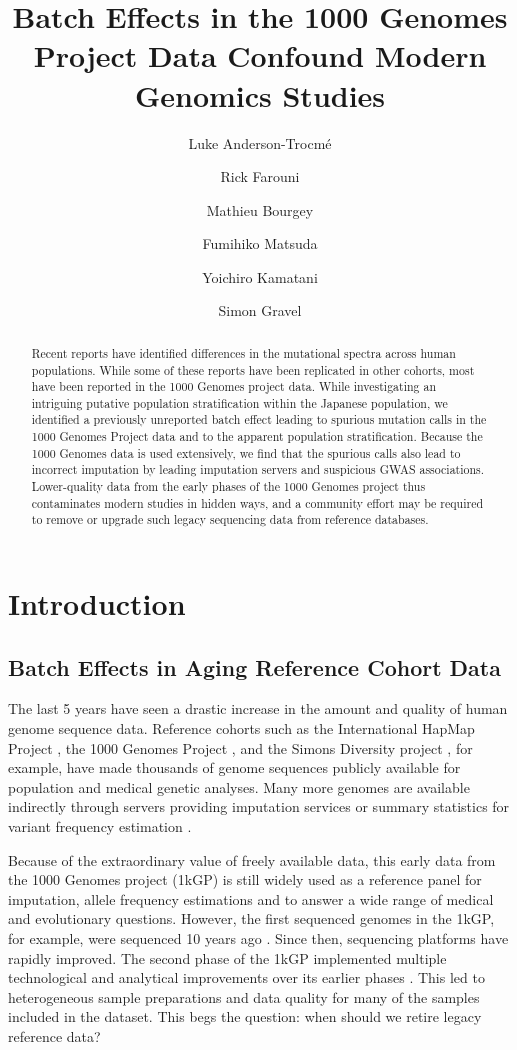 \documentclass[9pt,lineno]{elife}
\title{Batch Effects in the 1000 Genomes Project Data Confound Modern Genomics Studies}
\author[1,2]{Luke Anderson-Trocm\'e}
\author[1,2]{Rick Farouni}
\author[1,2]{Mathieu Bourgey}
\author[3]{Fumihiko Matsuda}
\author[3]{Yoichiro Kamatani}
\author[1,2]{Simon Gravel}
\affil[1]{Department of Human Genetics, McGill University, Montreal, QC H3A 0G1, Canada}
\affil[2]{McGill University and Genome Quebec Innovation Centre, Montreal, QC H3A 0G1, Canada}
\affil[3]{Center for Genomic Medicine, Graduate School of Medicine, Kyoto University, Kyoto 606-8501, Japan}
\begin{document}
\maketitle
\begin{abstract}
Recent reports have identified differences in the mutational spectra across human populations. While some of these reports have been replicated in other cohorts, most have been reported in the 1000 Genomes project data. While investigating an intriguing putative population stratification within the Japanese population, we identified a previously unreported batch effect leading to spurious mutation calls in the 1000 Genomes Project data and to the apparent population stratification. Because the 1000 Genomes data is used extensively, we find that the spurious calls also lead to incorrect imputation by leading imputation servers and suspicious GWAS associations. Lower-quality data from the early phases of the 1000 Genomes project thus contaminates modern studies in hidden ways, and a community effort may be required to remove or upgrade such legacy sequencing data from reference databases. 
\end{abstract}

\section{Introduction}
		
\subsection{Batch Effects in Aging Reference Cohort Data}			

The last 5 years have seen a drastic increase in the amount and quality of human genome sequence data. 
Reference cohorts such as the International HapMap Project \citep{HapMap2005}, the 1000 Genomes Project \citep{1000GenomesProjectConsortium2010,The1000GenomesProjectConsortium2012}, and the Simons Diversity project \citep{Mallick2016}, for example, have made thousands of genome sequences publicly available for population and medical genetic analyses. 
Many more genomes are available indirectly through servers providing imputation services \citep{HapMap2005} or summary statistics for variant frequency estimation \citep{Lek2016}.

Because of the extraordinary value of freely available data, this early data from the 1000 Genomes project (1kGP) is still widely used as a reference panel for imputation, allele frequency estimations and to answer a wide range of medical and evolutionary questions. 
However, the first sequenced genomes in the 1kGP, for example, were sequenced 10 years ago \citep{VanDijk2014}. Since then, sequencing platforms have rapidly improved. 
The second phase of the 1kGP implemented multiple technological and analytical improvements over its earlier phases \citep{The1000GenomesProjectConsortium2012}. 
This led to heterogeneous sample preparations and data quality for many of the samples included in the dataset.
This begs the question: when should we retire legacy reference data?
\end{document}

